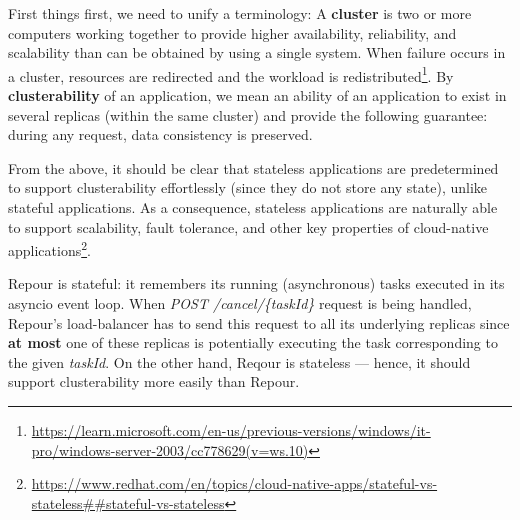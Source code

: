 \documentclass[../main.tex]{subfiles}
\begin{document}
First things first, we need to unify a terminology: A \textbf{cluster} is two or more computers working together to provide higher availability, reliability, and scalability than can be obtained by using a single system. When failure occurs in a cluster, resources are redirected and the workload is redistributed\footnote{\url{https://learn.microsoft.com/en-us/previous-versions/windows/it-pro/windows-server-2003/cc778629(v=ws.10)}}. By \textbf{clusterability} of an application, we mean an ability of an application to exist in several replicas (within the same cluster) and provide the following guarantee: during any request, data consistency is preserved.

From the above, it should be clear that stateless applications are predetermined to support clusterability effortlessly (since they do not store any state), unlike stateful applications. As a consequence, stateless applications are naturally able to support scalability, fault tolerance, and other key properties of cloud-native applications\footnote{\url{https://www.redhat.com/en/topics/cloud-native-apps/stateful-vs-stateless##stateful-vs-stateless}}.

Repour is stateful: it remembers its running (asynchronous) tasks executed in its asyncio event loop. When \textit{POST /cancel/\{taskId\}} request is being handled, Repour's load-balancer has to send this request to all its underlying replicas since \textbf{at most} one of these replicas is potentially executing the task corresponding to the given \textit{taskId}. On the other hand, Reqour is stateless — hence, it should support clusterability more easily than Repour.
\end{document}
